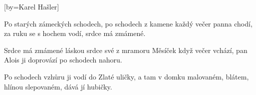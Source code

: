 [by={Karel Hašler}]

\beginverse{}
\lrep{} Po starých zámeckých schodech, po schodech z kamene \rrep{}
\lrep{} každý večer panna chodí, za ruku se s hochem vodí, srdce má zmámené.
\endverse{}

\beginverse{}
\lrep{} Srdce má zmámené láskou srdce své z mramoru \rrep{}
\lrep{} Měsíček když večer vchází, pan Alois ji doprovází po schodech nahoru. \rrep{}
\endverse{}

\beginverse{}
\lrep{} Po schodech vzhůru ji vodí do Zlaté uličky, \rrep{}
\lrep{} a tam v domku malovaném, blátem, hlínou slepovaném, dává jí hubičky. \rrep{}
\endverse{}

\endsong{}
